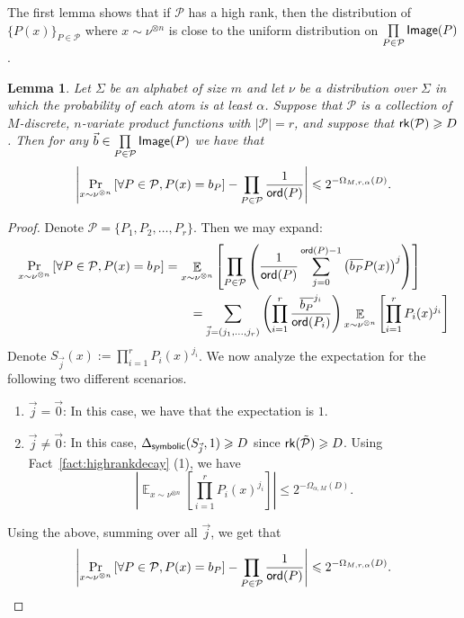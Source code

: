 \documentclass[11pt]{article}
\newtheorem{lemma}[thm]{Lemma}
\newcommand\card[1]{\left| {#1} \right|}
\newcommand\Prob[2]{{\Pr_{#1}\left[ {#2} \right]}}
\newcommand\Expect[2]{{\mathop{\mathbb{E}}_{#1}\left[ {#2} \right]}}
\renewcommand\geq{\geqslant}
\renewcommand\leq{\leqslant}
\begin{document}
The first lemma shows that if $\mathcal{P}$ has a high rank, then the distribution of $\{ P(x)\}_{P\in\mathcal{P}}$ where $x\sim 
\nu^{\otimes n}$ is close to the uniform distribution on $\prod\limits_{P\in\mathcal{P}}{\sf Image}(P)$.
      \begin{lemma}
    \label{lemma:quasirandom_onefunc}
		Let $\Sigma$ be an alphabet of size $m$ and let $\nu$ be a distribution over $\Sigma$ in which the probability of each atom is at least $\alpha$.
		Suppose that $\mathcal{P}$ is a collection of $M$-discrete, $n$-variate product functions with $|\mathcal{P}|=r$, and suppose that ${\sf rk}(\mathcal{P})\geq D$. Then for any $\vec{b}\in\prod\limits_{P\in\mathcal{P}}{\sf Image}(P)$ we have that
		\[
		\card{\Prob{x \sim\nu^{\otimes n}}{\forall P\in \mathcal{P}, P(x)= b_P}
		- \prod\limits_{P\in\mathcal{P}}\frac{1}{{\sf ord}(P)}}\leq 2^{-\Omega_{M,r,\alpha}(D)}.
		\]
	\end{lemma}

    \begin{proof}
 Denote $\mathcal{P} = \{ P_1, P_2, \ldots, P_r\}$. Then we may expand:
      \begin{align*}
          \Prob{x\sim\nu^{\otimes  n}}{\forall P\in \mathcal{P}, P(x)= b_P} &= \Expect{{x\sim\nu^{\otimes  n}}}{\prod_{P\in \mathcal{P}}\left( \frac{1}{{\sf ord}(P)} \sum_{j=0}^{{\sf ord}(P)-1}\left(\overline{b_P}P(x)\right)^j\right)}\\
          &\quad\quad= \sum_{\vec{j} = (j_1, \ldots, j_r)}  \left(\prod_{i=1}^r \frac{\overline{b_P}^{j_i}}{{\sf ord}(P_i)}\right) \Expect{x\sim\nu^{\otimes  n}}{\prod_{i=1}^r P_i(x)^{j_i}}\\
      \end{align*}
      Denote $S_{\vec{j}}(x):= \prod_{i=1}^r P_i(x)^{j_i}$. 
     We now analyze the expectation for the following two different scenarios. 
     \begin{enumerate}
         \item[(a)] $\vec{j}  = \vec{0}$: In this case, we have that the expectation is $1$.
         
         \item[(b)] $\vec{j}  \neq \vec{0}$: In this case, $\Delta_{{\sf symbolic}}(S_{\vec{j}},1)\geq D$ since ${\sf rk}(\tilde{\mathcal{P}})\geq D$. Using Fact~\ref{fact:highrankdecay} (1), we have 
         \[
         \card{\Expect{x\sim\nu^{\otimes  n}}{\prod_{i=1}^r P_i(x)^{j_i}}} \leq 2^{-\Omega_{\alpha, M}(D)}.
         \]
     \end{enumerate}
        Using the above, summing over all $\vec{j}$, we get that
\[
		\card{\Prob{x \sim\nu^{\otimes n}}{\forall P\in \mathcal{P}, P(x)= b_P}
		- \prod\limits_{P\in\mathcal{P}}\frac{1}{{\sf ord}(P)}}\leq 2^{-\Omega_{M,r,\alpha}(D)}.
        \qedhere
		\]

    \end{proof}
\end{document}
